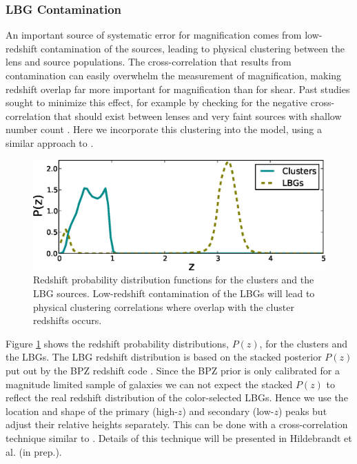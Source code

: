 \subsubsection{\ac{LBG} Contamination}
\label{contam}
An important source of systematic error for magnification comes from low-redshift contamination of the sources, leading to physical clustering between the lens and source populations. The cross-correlation that results from contamination can easily overwhelm the measurement of magnification, making redshift overlap far more important for magnification than for shear. Past studies sought to minimize this effect, for example by checking for the negative cross-correlation that should exist between lenses and very faint sources with shallow number count \citep{Ford12, Hildebrandt09b}. Here we incorporate this clustering into the model, using a similar approach to \citet{Hildebrandt13}.

\begin{figure}
\begin{center}
\includegraphics[scale=0.7]{plots_ch3/PofZ_clustersNudrops.eps}
\caption[Redshift Distributions of Clusters and Sources]{Redshift probability distribution functions for the clusters and the \ac{LBG} sources. Low-redshift contamination of the \ac{LBG}s will lead to physical clustering correlations where overlap with the cluster redshifts occurs.}
\label{pofz}
\end{center}
\end{figure}

Figure \ref{pofz} shows the redshift probability distributions, $P(z)$, for the clusters and the \ac{LBG}s. The \ac{LBG} redshift distribution is based on the stacked posterior $P(z)$ put out by the BPZ redshift code \citep[for details on the \ac{CFHTLenS} photo-$z$ see][]{Hildebrandt12}. Since the BPZ prior is only calibrated for a magnitude limited sample of galaxies we can not expect the stacked $P(z)$ to reflect the real redshift distribution of the color-selected \ac{LBG}s. Hence we use the location and shape of the primary (high-$z$) and secondary (low-$z$) peaks but adjust their relative heights separately. This can be done with a cross-correlation technique similar to \citet{Newman08}. Details of this technique will be presented in Hildebrandt et al. (in prep.).

